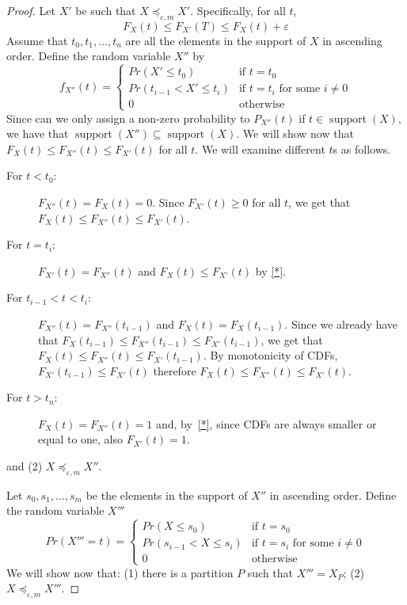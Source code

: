 \documentclass[review]{elsarticle}
\DeclareMathOperator{\support}{support}
\begin{document}
\begin{proof}
Let $X'$ be such that $X \preceq_{\varepsilon,m} X'$. Specifically, for all $t$,
\begin{equation}
F_{X}(t) \leq F_{X'}(T) \leq F_X(t)+\varepsilon
\label{*}
\end{equation}
Assume that $t_0,t_1,\dots,t_n$ are all the elements in the support of $X$ in ascending order. Define the random variable $X''$ by 
$$
f_{X''}(t) = \begin{cases}
Pr(X' \leq t_0)           & \text{if } t=t_0  \\ 
Pr(t_{i-1} < X' \leq t_i) & \text{if } t=t_i \text{ for some } i \neq 0 \\ 
0                         & \text{otherwise}
\end{cases}
$$
Since can we only assign a non-zero probability to $P_{X''}(t)$ if $t \in \support(X)$, we have that $\support(X'') \subseteq \support(X)$. We will show now that $F_{X}(t) \leq  F_{X''}(t) \leq F_{X'}(t)$ for all $t$. We will examine different $t$s as follows. 
\begin{description}
\item[For $t < t_0$:] $F_{X''}(t)=F_{X}(t)=0$. Since $F_{X'}(t) \geq 0$ for all $t$, we get that $F_{X}(t) \leq  F_{X''}(t) \leq F_{X'}(t)$.
\item[For $t=t_i$:] $F_{X'}(t)=F_{X''}(t)$ and $F_{X}(t) \leq F_{X'}(t)$ by \eqref{*}.
\item[For $t_{i-1} < t < t_i$:] $F_{X''}(t)= F_{X''}(t_{i-1})$ and $F_{X}(t)=F_{X}(t_{i-1})$. Since we already have that $F_{X}(t_{i-1}) \leq F_{X''}(t_{i-1}) \leq F_{X'}(t_{i-1})$, we get that $F_{X}(t) \leq F_{X''}(t) \leq F_{X'}(t_{i-1})$. By monotonicity of CDFs, $F_{X'}(t_{i-1}) \leq F_{X'}(t)$ therefore $F_{X}(t) \leq F_{X''}(t) \leq F_{X'}(t)$.
\item[For $t > t_n$:] $F_{X}(t)= F_{X''}(t)=1$ and, by~\eqref{*}, since CDFs are always smaller or equal to one, also $F_{X'}(t)=1$.

\end{description}


and (2) $X \preceq_{\varepsilon,m} X''$. 


Let $s_0,s_1,\dots,s_m$ be the elements in the support of $X''$ in ascending order. Define the random variable $X'''$
$$
Pr(X'''=t) = \begin{cases}
Pr(X \leq s_0)           & \text{if } t=s_0  \\ 
Pr(s_{i-1} < X \leq s_i) & \text{if } t=s_i \text{ for some } i \neq 0 \\ 
0                        & \text{otherwise}
\end{cases}
$$
We will show now that: (1) there is a partition $P$ such that $X'''=X_P$; (2) $X \preceq_{\varepsilon,m} X'''$. 


\end{proof}
\end{document}
